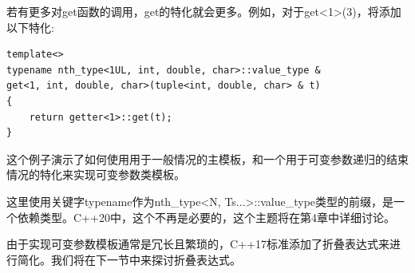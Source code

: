 若有更多对get函数的调用，get的特化就会更多。例如，对于get<1>(3)，将添加以下特化:

\begin{lstlisting}[style=styleCXX]
template<>
typename nth_type<1UL, int, double, char>::value_type &
get<1, int, double, char>(tuple<int, double, char> & t)
{
	return getter<1>::get(t);
}
\end{lstlisting}

这个例子演示了如何使用用于一般情况的主模板，和一个用于可变参数递归的结束情况的特化来实现可变参数类模板。

这里使用关键字typename作为nth\_type<N, Ts...>::value\_type类型的前缀，是一个依赖类型。C++20中，这个不再是必要的，这个主题将在第4章中详细讨论。

由于实现可变参数模板通常是冗长且繁琐的，C++17标准添加了折叠表达式来进行简化。我们将在下一节中来探讨折叠表达式。


